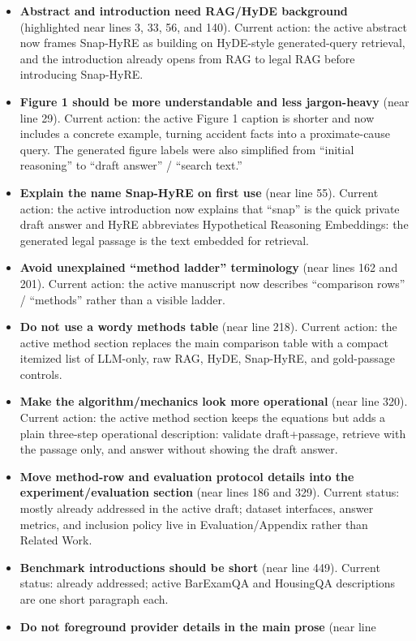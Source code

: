 \begin{itemize}[leftmargin=*]
\item \textbf{Abstract and introduction need RAG/HyDE background}
(highlighted near lines 3, 33, 56, and 140). Current action: the active
abstract now frames Snap-HyRE as building on HyDE-style generated-query
retrieval, and the introduction already opens from RAG to legal RAG before
introducing Snap-HyRE.
\item \textbf{Figure 1 should be more understandable and less jargon-heavy}
(near line 29). Current action: the active Figure 1 caption is shorter and now
includes a concrete example, turning accident facts into a proximate-cause
query. The generated figure labels were also simplified from ``initial
reasoning'' to ``draft answer'' / ``search text.''
\item \textbf{Explain the name Snap-HyRE on first use} (near line 55).
Current action: the active introduction now explains that ``snap'' is the quick
private draft answer and HyRE abbreviates Hypothetical Reasoning Embeddings:
the generated legal passage is the text embedded for retrieval.
\item \textbf{Avoid unexplained ``method ladder'' terminology} (near lines 162
and 201). Current action: the active manuscript now describes ``comparison
rows'' / ``methods'' rather than a visible ladder.
\item \textbf{Do not use a wordy methods table} (near line 218). Current
action: the active method section replaces the main comparison table with a
compact itemized list of LLM-only, raw RAG, HyDE, Snap-HyRE, and gold-passage
controls.
\item \textbf{Make the algorithm/mechanics look more operational} (near line
320). Current action: the active method section keeps the equations but adds a
plain three-step operational description: validate draft+passage, retrieve
with the passage only, and answer without showing the draft answer.
\item \textbf{Move method-row and evaluation protocol details into the
experiment/evaluation section} (near lines 186 and 329). Current status: mostly
already addressed in the active draft; dataset interfaces, answer metrics, and
inclusion policy live in Evaluation/Appendix rather than Related Work.
\item \textbf{Benchmark introductions should be short} (near line 449).
Current status: already addressed; active BarExamQA and HousingQA descriptions
are one short paragraph each.
\item \textbf{Do not foreground provider details in the main prose} (near line

\end{itemize}
